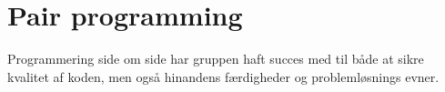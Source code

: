 \section{Pair programming}\label{sec:pairprogramming}
Programmering side om side har gruppen haft succes med til både at sikre kvalitet af koden, men også hinandens færdigheder og 
problemløsnings evner. 